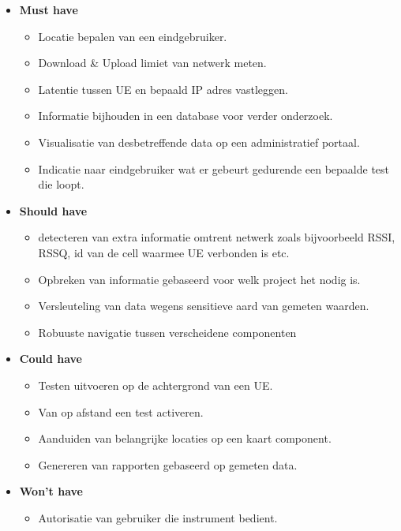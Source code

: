 \begin{itemize}
    \item \textbf{Must have}
    \begin{itemize}
        \item Locatie bepalen van een eindgebruiker.
        \item Download \& Upload limiet van netwerk meten.
        \item Latentie tussen UE en bepaald IP adres vastleggen.
        \item Informatie bijhouden in een database voor verder onderzoek.
        \item Visualisatie van desbetreffende data op een administratief portaal.
        \item Indicatie naar eindgebruiker wat er gebeurt gedurende een bepaalde test die loopt.
    \end{itemize}
    \item \textbf{Should have}
    \begin{itemize}
        \item detecteren van extra informatie omtrent netwerk zoals bijvoorbeeld RSSI, RSSQ, id van de cell waarmee UE verbonden is etc.
        \item Opbreken van informatie gebaseerd voor welk project het nodig is.
        \item Versleuteling van data wegens sensitieve aard van gemeten waarden.
        \item Robuuste navigatie tussen verscheidene componenten
    \end{itemize}
    \item \textbf{Could have}
    \begin{itemize}
        \item Testen uitvoeren op de achtergrond van een UE.
        \item Van op afstand een test activeren.
        \item Aanduiden van belangrijke locaties op een kaart component.
        \item Genereren van rapporten gebaseerd op gemeten data.
    \end{itemize}
    \item \textbf{Won't have}
    \begin{itemize}
        \item Autorisatie van gebruiker die instrument bedient.
    \end{itemize}
\end{itemize}

